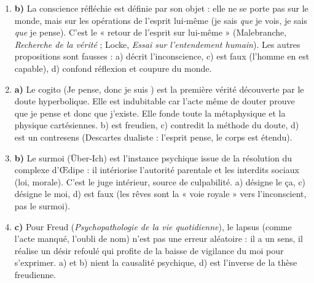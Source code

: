 \documentclass[11pt]{article}
\newcommand{\cle}[1]{{\popxbold\color{popdark}#1}}
\begin{document}
\begin{corrige}
\begin{enumerate}
\item \textbf{b)} La conscience \cle{réfléchie} est définie par son objet : elle ne se porte pas sur le monde, mais sur les opérations de l'esprit lui-même (je sais \emph{que} je vois, je sais \emph{que} je pense). C'est le « retour de l'esprit sur lui-même » (Malebranche, \emph{Recherche de la vérité} ; Locke, \emph{Essai sur l'entendement humain}). Les autres propositions sont fausses : a) décrit l'inconscience, c) est faux (l'homme en est capable), d) confond réflexion et coupure du monde.
\item \textbf{a)} Le \cle{cogito} (\guillemotleft Je pense, donc je suis \guillemotright) est la \cle{première vérité} découverte par le doute hyperbolique. Elle est indubitable car l'acte même de douter prouve que je pense et donc que j'existe. Elle fonde toute la métaphysique et la physique cartésiennes. b) est freudien, c) contredit la méthode du doute, d) est un contresens (Descartes dualiste : l'esprit pense, le corps est étendu).
\item \textbf{b)} Le \cle{surmoi} (Über-Ich) est l'instance psychique issue de la résolution du complexe d'Œdipe : il intériorise l'autorité parentale et les interdits sociaux (loi, morale). C'est le juge intérieur, source de culpabilité. a) désigne le \cle{ça}, c) désigne le \cle{moi}, d) est faux (les rêves sont la « voie royale » vers l'inconscient, pas le surmoi).
\item \textbf{c)} Pour Freud (\emph{Psychopathologie de la vie quotidienne}), le \cle{lapsus} (comme l'acte manqué, l'oubli de nom) n'est pas une erreur aléatoire : il a un sens, il réalise un désir refoulé qui profite de la baisse de vigilance du moi pour s'exprimer. a) et b) nient la causalité psychique, d) est l'inverse de la thèse freudienne.
\end{enumerate}
\end{corrige}
\end{document}
